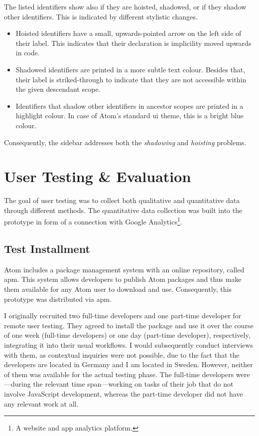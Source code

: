 The listed identifiers show also if they are hoisted, shadowed, or if
they shadow other identifiers. This is indicated by different stylistic
changes.

\begin{itemize}
\itemsep1pt\parskip0pt
\item
  Hoisted identifiers have a small, upwards-pointed arrow on the left
  side of their label. This indicates that their declaration is
  implicility moved upwards in code.
\item
  Shadowed identifiers are printed in a more subtle text colour. Besides
  that, their label is striked-through to indicate that they are not
  accessible within the given descendant scope.
\item
  Identifiers that shadow other identifiers in ancestor scopes are
  printed in a highlight colour. In case of Atom’s standard \ac{ui}
  theme, this is a bright blue colour.
\end{itemize}

Consequently, the sidebar addresses both the \emph{shadowing} and
\emph{hoisting} problems.

\section{User Testing \& Evaluation}\label{user-testing-evaluation}

The goal of user testing was to collect both qualitative and
quantitative data through different methods. The quantitative data
collection was built into the prototype in form of a connection with
Google Analytics\footnote{A website and app analytics platform.}.

\subsection{Test Installment}\label{test-installment}

Atom includes a package management system with an online repository,
called \ac{apm}. This system allows developers to publish Atom packages
and thus make them available for any Atom user to download and use.
Consequently, this prototype was distributed via \ac{apm}.

I originally recruited two full-time developers and one part-time
developer for remote user testing. They agreed to install the package
and use it over the course of one week (full-time developers) or one day
(part-time developer), respectively, integrating it into their usual
workflows. I would subsequently conduct interviews with them, as
contextual inquiries were not possible, due to the fact that the
developers are located in Germany and I am located in Sweden. However,
neither of them was available for the actual testing phase. The
full-time developers were—during the relevant time span—working on tasks
of their job that do not involve JavaScript development, whereas the
part-time developer did not have any relevant work at all.

